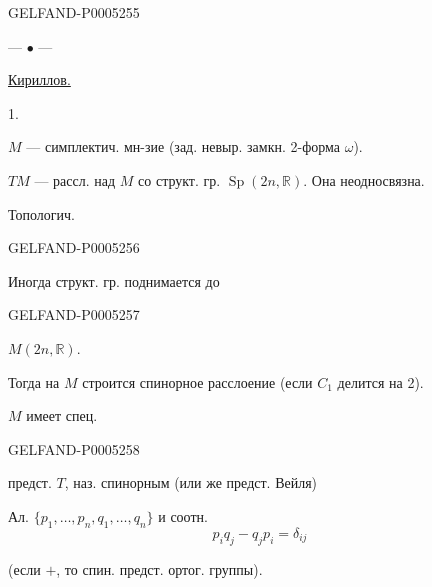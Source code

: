 \begin{GelfandAdjacentEvidence}{GELFAND-P000525}{5}

\begin{center}— $\bullet$ —\end{center}

\uline{Кириллов.}

1. 

$M$ — симплектич. мн-зие (зад. невыр. замкн. 2-форма $\omega$).

$TM$ — рассл. над $M$ со структ. гр. $\operatorname{Sp}(2n,\mathbb R)$. Она неодносвязна.

Топологич.
\end{GelfandAdjacentEvidence}
\begin{GelfandAdjacentEvidence}{GELFAND-P000525}{6}

Иногда структ. гр. поднимается до
\end{GelfandAdjacentEvidence}
\begin{GelfandAdjacentEvidence}{GELFAND-P000525}{7}

$M(2n,\mathbb R)$.

Тогда на $M$ строится спинорное расслоение (если $C_1$ делится на 2).

$M$ имеет спец.
\end{GelfandAdjacentEvidence}
\begin{GelfandAdjacentEvidence}{GELFAND-P000525}{8}

предст. $T$, наз. спинорным (или же предст. Вейля)

Ал. $\{p_1,\ldots,p_n,q_1,\ldots,q_n\}$ и соотн.
\[
p_iq_j-q_jp_i=\delta_{ij}
\]
\end{GelfandAdjacentEvidence}

(если $+$, то спин. предст. ортог. группы).

